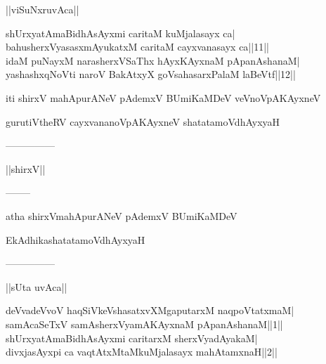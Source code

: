 \documentclass{article}
\begin{document}
\begin{center}
||viSuNxruvAca||
\end{center}

shUrxyatAmaBidhAsAyxmi caritaM kuMjalasayx ca|\\
bahusherxVyasasxmAyukatxM caritaM cayxvanasayx ca||11||\\
idaM puNayxM narasherxVSaThx hAyxKAyxnaM pApanAshanaM|\\
yashashxqNoVti naroV BakAtxyX goVsahasarxPalaM laBeVtf||12||\\

\begin{center}
iti shirxV mahApurANeV pAdemxV BUmiKaMDeV veVnoVpAKAyxneV
\end{center}

\begin{center}
gurutiVtheRV cayxvananoVpAKAyxneV shatatamoVdhAyxyaH
\end{center}

\begin{center}
---------------
\end{center}

\begin{center}
||shirxV||
\end{center}

\begin{center}
--------
\end{center}

\begin{center}
atha shirxVmahApurANeV pAdemxV BUmiKaMDeV
\end{center}

\begin{center}
EkAdhikashatatamoVdhAyxyaH
\end{center}

\begin{center}
---------------
\end{center}

\begin{center}
||sUta uvAca||
\end{center}

deVvadeVvoV haqSiVkeVshasatxvXMgaputarxM naqpoVtatxmaM|\\
samAcaSeTxV samAsherxVyamAKAyxnaM pApanAshanaM||1||\\
shUrxyatAmaBidhAsAyxmi caritarxM sherxVyadAyakaM|\\
divxjasAyxpi ca vaqtAtxMtaMkuMjalasayx mahAtamxnaH||2||\\
\end{document}
